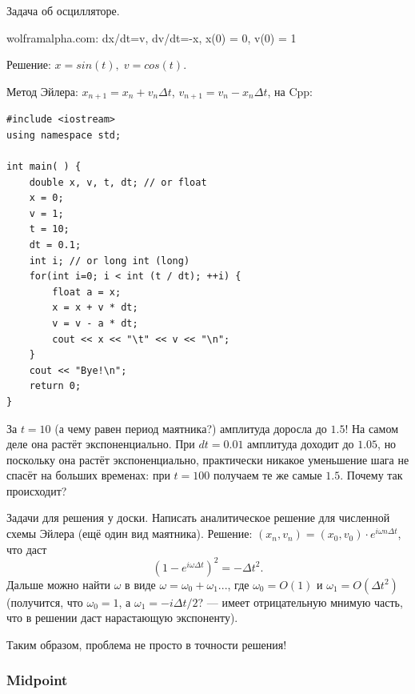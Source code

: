 \documentclass{book}
\begin{document}
Задача об осцилляторе.

wolframalpha.com: dx/dt=v, dv/dt=-x, x(0) = 0, v(0) = 1

Решение: $x = sin(t), \; v = cos(t)$.

Метод Эйлера: $x_{n+1} = x_n + v_n \Delta t$, $v_{n+1} = v_n - x_n \Delta t$, на Cpp:

\begin{verbatim}
#include <iostream> 
using namespace std;

int main( ) { 
    double x, v, t, dt; // or float
    x = 0; 
    v = 1; 
    t = 10; 
    dt = 0.1; 
    int i; // or long int (long)
    for(int i=0; i < int (t / dt); ++i) { 
        float a = x; 
        x = x + v * dt; 
        v = v - a * dt; 
        cout << x << "\t" << v << "\n";
    } 
    cout << "Bye!\n";
    return 0; 
}
\end{verbatim}
За $t = 10$ (а чему равен период маятника?) амплитуда доросла до $1.5$! На самом деле она растёт
экспоненциально. При $dt = 0.01$ амплитуда доходит до $1.05$, но поскольку она растёт
экспоненциально, практически никакое уменьшение шага не спасёт на больших временах: при $t = 100$
получаем те же самые $1.5$. Почему так происходит?

Задачи для решения у доски. Написать аналитическое решение для численной схемы Эйлера (ещё один вид
маятника). Решение: $(x_n, v_n) = (x_0, v_0) \cdot e^{i \omega n \Delta t}$, что даст
\begin{equation}
    (1 - e^{i \omega \Delta t})^2 = -\Delta t^2.
\end{equation}
Дальше можно найти $\omega$ в виде $\omega = \omega_0 + \omega_1 ...$, где $\omega_0 = O(1)$ и
$\omega_1 = O(\Delta t^2)$ (получится, что
$\omega_0 = 1$, а $\omega_1 = -i \Delta t / 2$? --- имеет отрицательную мнимую часть, что в решении
даст нарастающую экспоненту).

Таким образом, проблема не просто в точности решения!

\subsubsection{Midpoint}
\end{document}
